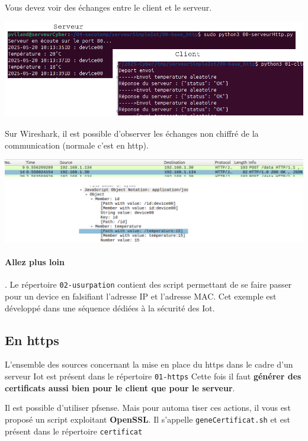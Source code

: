 \documentclass[french, 12pt]{article}%
\begin{document}
Vous devez voir des échanges entre le client et le serveur.
\begin{center}
\includegraphics[scale=0.5]{./ressource/exServeurIotHttp}
\end{center}

Sur Wireshark, il est possible d'observer les échanges non chiffré de la communication (normale c'est en http). 
\begin{center}
\includegraphics[scale=0.4]{./ressource/resWireshark}
\end{center}

\paragraph{Allez plus loin}. Le répertoire \verb?02-usurpation? contient des script permettant de se faire passer pour un device en falsifiant l'adresse IP et l'adresse MAC. Cet exemple est développé dans une séquence dédiées à la sécurité des Iot.

\subsection{En https}

L'ensemble des sources concernant la mise en place du https dans le cadre d'un serveur Iot est présent dans le répertoire \verb?01-https? Cette fois il faut \textbf{générer des certificats aussi bien pour le client que pour le serveur}.

\vspace{0.5cm}
Il est possible d'utiliser pfsense. Mais pour automa	tiser ces actions, il vous est proposé un script exploitant  \textbf{OpenSSL}. Il s'appelle \verb?geneCertificat.sh? et est présent dans le répertoire \verb?certificat?
\end{document}
